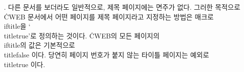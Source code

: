 {%
%
. 다른 문서를 보더라도 일반적으로, 제목 페이지에는 면주가 없다. 그러한 목적으로
\.{CWEB} 문서에서 어떤 페이지를 제목 페이지라고 지정하는 방법은 매크로 \.{\\iftitle}을
`\.{\\titletrue}'로 정의하는 것이다. \.{CWEB}의 모든 페이지의 \.{\\iftitle}의 값은
기본적으로 \.{\\titlefalse} 이다. 당연히 페이지 번호가 붙지 않는 타이틀 페이지는 예외로
\.{\\titletrue} 이다.

}
